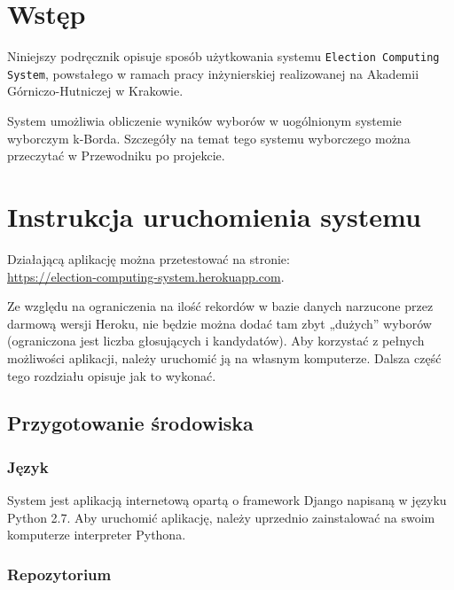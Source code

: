 \documentclass[pdflatex,11pt]{../aghdoc}
\author{Tomasz Kasprzyk, Daniel Ogiela, Jakub Stępak}
\date{2016}
\begin{document}
\titlepages

\tableofcontents


\chapter{Wstęp}
\label{cha:wstep}

Niniejszy podręcznik opisuje sposób użytkowania systemu \texttt{Election Computing System}, powstałego w ramach pracy inżynierskiej realizowanej na Akademii Górniczo-Hutniczej w Krakowie.

System umożliwia obliczenie wyników wyborów w uogólnionym systemie wyborczym k-Borda. Szczegóły na temat tego systemu wyborczego można przeczytać w Przewodniku po projekcie.


\chapter{Instrukcja uruchomienia systemu}
\label{cha:uruchomienie}

Działającą aplikację można przetestować na stronie: \\ \url{https://election-computing-system.herokuapp.com}. 

Ze względu na ograniczenia na ilość rekordów w bazie danych narzucone przez darmową wersji Heroku, nie będzie można dodać tam zbyt „dużych” wyborów (ograniczona jest liczba głosujących i kandydatów). Aby korzystać z pełnych możliwości aplikacji, należy uruchomić ją na własnym komputerze. Dalsza część tego rozdziału opisuje jak to wykonać.

\section{Przygotowanie środowiska}
\label{sec:srodowisko}

\subsection{Język}
\label{subsec:jezyk}

System jest aplikacją internetową opartą o framework Django napisaną w języku Python 2.7.
Aby uruchomić aplikację, należy uprzednio zainstalować na swoim komputerze interpreter Pythona.

\subsection{Repozytorium}
\label{subsec:repo}
\end{document}
